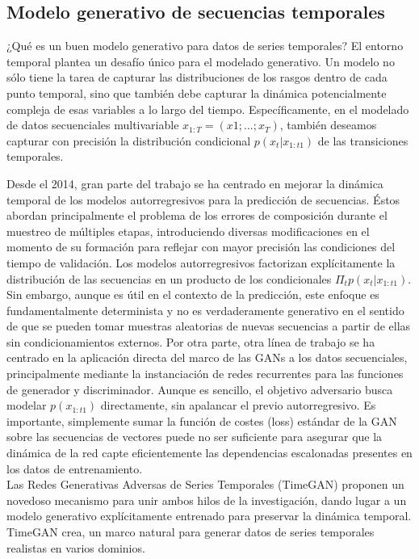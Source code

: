 

\subsection{Modelo generativo de secuencias temporales}

¿Qué es un buen modelo generativo para datos de series temporales? El entorno temporal plantea un desafío único para el modelado generativo. Un modelo no sólo tiene la tarea de capturar las distribuciones de los rasgos dentro de cada punto temporal, sino que también debe capturar la dinámica potencialmente compleja de esas variables a lo largo del tiempo. Específicamente, en el modelado de datos secuenciales multivariable $x_{1:T} = (x1; ... ; x_T )$, también deseamos capturar con precisión la distribución condicional $p(x_t|x_{1:t1})$ de las transiciones temporales. 

Desde el 2014, gran parte del trabajo se ha centrado en mejorar la dinámica temporal de los modelos autorregresivos para la predicción de secuencias. Éstos abordan principalmente el problema de los errores de composición durante el muestreo de múltiples etapas, introduciendo diversas modificaciones en el momento de su formación para reflejar con mayor precisión las condiciones del tiempo de validación. Los modelos autorregresivos factorizan explícitamente la distribución de las secuencias en un producto de los condicionales $\Pi_t p(x_t|x_{1:t1})$. Sin embargo, aunque es útil en el contexto de la predicción, este enfoque es fundamentalmente determinista y no es verdaderamente generativo en el sentido de que se pueden tomar muestras aleatorias de nuevas secuencias a partir de ellas sin condicionamientos externos. Por otra parte, otra línea de trabajo se ha centrado en la aplicación directa del marco de las GANs a los datos secuenciales, principalmente mediante la instanciación de redes recurrentes para las funciones de generador y discriminador. Aunque es sencillo, el objetivo adversario busca modelar $p(x_{1:t1})$ directamente, sin apalancar el previo autorregresivo. Es importante, simplemente sumar la función de costes (loss) estándar de la GAN sobre las secuencias de vectores puede no ser suficiente para asegurar que la dinámica de la red capte eficientemente las dependencias escalonadas presentes en los datos de entrenamiento.\\

Las Redes Generativas Adversas de Series Temporales (TimeGAN) proponen un novedoso mecanismo para unir ambos hilos de la investigación, dando lugar a un modelo generativo explícitamente entrenado para preservar la dinámica temporal. TimeGAN crea, un marco natural para generar datos de series temporales realistas en varios dominios. 

